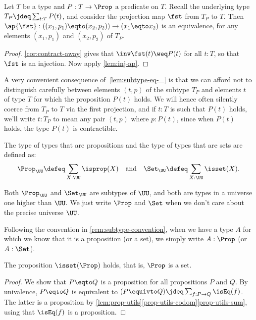 \begin{lemma}\label{lem:subtype-eq-=}
  Let $T$ be a type and $P: T\to\Prop$ a predicate on $T$.
  Recall the underlying type $T_P \jdeq \sum_{t:T}P(t)$, and
  consider the projection map $\fst$ from $T_P$ to $T$.
  Then $\ap{\fst}: ((x_1,p_1) \eqto (x_2,p_2)) \to (x_1 \eqto x_2)$ is an
  equivalence, for any elements $(x_1,p_1)$ and $(x_2,p_2)$ of $T_P$.
\end{lemma}

\begin{proof}
\cref{cor:contract-away} gives that $\inv\fst(t)\weq P(t)$ for all $t:T$,
so that $\fst$ is an injection. Now apply \cref{lem:inj-ap}. 
\end{proof}

\begin{remark}\label{rem:subtype-convention}
  A very convenient consequence of~\cref{lem:subtype-eq-=}
  is that we can afford not to distinguish carefully
  between elements $(t,p)$ of the subtype $T_P$
  and elements $t$ of type $T$ for which the proposition $P(t)$ holds.
  We will hence often silently coerce from $T_P$ to $T$ via the first projection,
  and if $t:T$ is such that $P(t)$ holds, we'll write $t:T_P$
  to mean any pair $(t,p)$ where $p:P(t)$,
  since when $P(t)$ holds, the type $P(t)$ is contractible.
\end{remark}

\begin{example}\label{def:Prop-Set}
The type of types that are propositions and the
type of types that are sets are defined as:
\[\Prop_\UU\defeq \sum_{X:\UU}\isprop(X)\quad
\text{and}\quad\Set_\UU\defeq \sum_{X:\UU}\isset(X).\]

Both $\Prop_\UU$ and $\Set_\UU$ are subtypes of $\UU$, and
both are types in a universe one higher than $\UU$.
We just write $\Prop$ and $\Set$ when we don't care about the 
precise universe $\UU$.

Following the convention in \cref{rem:subtype-convention},
when we have a type $A$ for which we know that it is a proposition (or a set),
we simply write $A : \Prop$ (or $A : \Set$).
\end{example}

\begin{lemma}\label{lem:Prop-in-Set}
The proposition $\isset(\Prop)$ holds, that is, $\Prop$ is a set.
\end{lemma}
\begin{proof}
We show that $P\eqto Q$ is a proposition for all propositions $P$ and $Q$.
By univalence, $P\eqto Q$ is equivalent to 
$(P\equivto Q)\jdeq\sum_{f:P\to Q}\isEq(f)$.
The latter is a proposition by \cref{lem:prop-utils}\ref{prop-utils-codom}\ref{prop-utils-sum}, using that $\isEq(f)$ is a proposition.
\end{proof}

